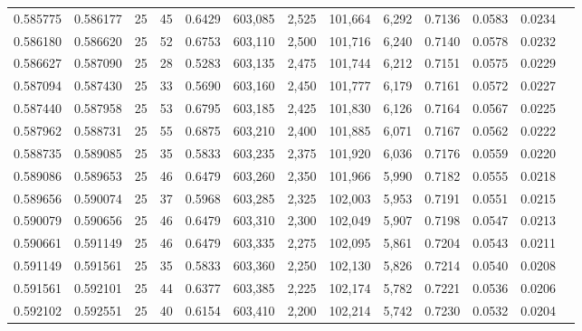 \begin{tabular}{rrrrrrrrrrrrr}
0.585775 & 0.586177 &    25 &  45 &                                     0.6429 & 603,085 &   2,525 & 101,664 &   6,292 & 0.7136 & 0.0583 & 0.0234 \\
0.586180 & 0.586620 &    25 &  52 &                                     0.6753 & 603,110 &   2,500 & 101,716 &   6,240 & 0.7140 & 0.0578 & 0.0232 \\
0.586627 & 0.587090 &    25 &  28 &                                     0.5283 & 603,135 &   2,475 & 101,744 &   6,212 & 0.7151 & 0.0575 & 0.0229 \\
0.587094 & 0.587430 &    25 &  33 &                                     0.5690 & 603,160 &   2,450 & 101,777 &   6,179 & 0.7161 & 0.0572 & 0.0227 \\
0.587440 & 0.587958 &    25 &  53 &                                     0.6795 & 603,185 &   2,425 & 101,830 &   6,126 & 0.7164 & 0.0567 & 0.0225 \\
0.587962 & 0.588731 &    25 &  55 &                                     0.6875 & 603,210 &   2,400 & 101,885 &   6,071 & 0.7167 & 0.0562 & 0.0222 \\
0.588735 & 0.589085 &    25 &  35 &                                     0.5833 & 603,235 &   2,375 & 101,920 &   6,036 & 0.7176 & 0.0559 & 0.0220 \\
0.589086 & 0.589653 &    25 &  46 &                                     0.6479 & 603,260 &   2,350 & 101,966 &   5,990 & 0.7182 & 0.0555 & 0.0218 \\
0.589656 & 0.590074 &    25 &  37 &                                     0.5968 & 603,285 &   2,325 & 102,003 &   5,953 & 0.7191 & 0.0551 & 0.0215 \\
0.590079 & 0.590656 &    25 &  46 &                                     0.6479 & 603,310 &   2,300 & 102,049 &   5,907 & 0.7198 & 0.0547 & 0.0213 \\
0.590661 & 0.591149 &    25 &  46 &                                     0.6479 & 603,335 &   2,275 & 102,095 &   5,861 & 0.7204 & 0.0543 & 0.0211 \\
0.591149 & 0.591561 &    25 &  35 &                                     0.5833 & 603,360 &   2,250 & 102,130 &   5,826 & 0.7214 & 0.0540 & 0.0208 \\
0.591561 & 0.592101 &    25 &  44 &                                     0.6377 & 603,385 &   2,225 & 102,174 &   5,782 & 0.7221 & 0.0536 & 0.0206 \\
0.592102 & 0.592551 &    25 &  40 &                                     0.6154 & 603,410 &   2,200 & 102,214 &   5,742 & 0.7230 & 0.0532 & 0.0204 \\

\end{tabular}
